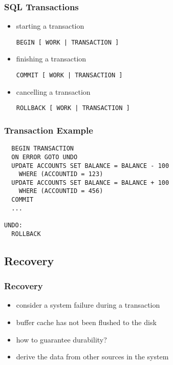 \documentclass[dvipsnames]{beamer}
\theoremstyle{plain}
\begin{document}
\begin{frame}[fragile]
  \frametitle{SQL Transactions}

  \begin{itemize}
    \item starting a transaction
    \begin{lstlisting}
BEGIN [ WORK | TRANSACTION ]
    \end{lstlisting}

    \item finishing a transaction
    \begin{lstlisting}
COMMIT [ WORK | TRANSACTION ]
    \end{lstlisting}

    \item cancelling a transaction
    \begin{lstlisting}
ROLLBACK [ WORK | TRANSACTION ]
    \end{lstlisting}
  \end{itemize}
\end{frame}

\begin{frame}[fragile]
  \frametitle{Transaction Example}

  \begin{lstlisting}
  BEGIN TRANSACTION
  ON ERROR GOTO UNDO
  UPDATE ACCOUNTS SET BALANCE = BALANCE - 100
    WHERE (ACCOUNTID = 123)
  UPDATE ACCOUNTS SET BALANCE = BALANCE + 100
    WHERE (ACCOUNTID = 456)
  COMMIT
  ...

UNDO:
  ROLLBACK
  \end{lstlisting}
\end{frame}

\subsection{Recovery}

\begin{frame}
  \frametitle{Recovery}

  \begin{itemize}
    \item consider a system failure during a transaction
    \item buffer cache has not been flushed to the disk

    \pause
    \medskip
    \item how to guarantee durability?
    \item derive the data from other sources in the system
  \end{itemize}
\end{frame}
\end{document}
